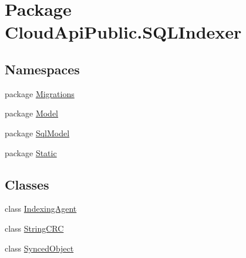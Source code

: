 \hypertarget{namespace_cloud_api_public_1_1_s_q_l_indexer}{\section{Package Cloud\-Api\-Public.\-S\-Q\-L\-Indexer}
\label{namespace_cloud_api_public_1_1_s_q_l_indexer}
}
\subsection*{Namespaces}
\begin{DoxyCompactItemize}
\item 
package \hyperlink{namespace_cloud_api_public_1_1_s_q_l_indexer_1_1_migrations}{Migrations}
\item 
package \hyperlink{namespace_cloud_api_public_1_1_s_q_l_indexer_1_1_model}{Model}
\item 
package \hyperlink{namespace_cloud_api_public_1_1_s_q_l_indexer_1_1_sql_model}{Sql\-Model}
\item 
package \hyperlink{namespace_cloud_api_public_1_1_s_q_l_indexer_1_1_static}{Static}
\end{DoxyCompactItemize}
\subsection*{Classes}
\begin{DoxyCompactItemize}
\item 
class \hyperlink{class_cloud_api_public_1_1_s_q_l_indexer_1_1_indexing_agent}{Indexing\-Agent}
\item 
class \hyperlink{class_cloud_api_public_1_1_s_q_l_indexer_1_1_string_c_r_c}{String\-C\-R\-C}
\item 
class \hyperlink{class_cloud_api_public_1_1_s_q_l_indexer_1_1_synced_object}{Synced\-Object}
\end{DoxyCompactItemize}
